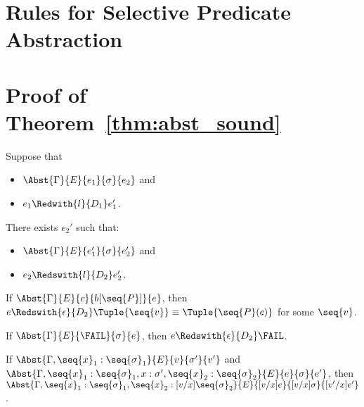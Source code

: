 \appendix

\section{Rules for Selective Predicate Abstraction}


\section{Proof of Theorem~\ref{thm:abst_sound}}



\begin{lemma}
\label{lem:sim}
Suppose that
\begin{itemize}
\item $\Abst{\Gamma}{E}{e_1}{\sigma}{e_2}$ and
\item $e_1 \Redwith{l}{D_1} e_1'$.
\end{itemize}
There exists $e_2'$ such that:
\begin{itemize}
\item $\Abst{\Gamma}{E}{e_1'}{\sigma}{e_2'}$ and
\item $e_2 \Redswith{l}{D_2} e_2'$.
\end{itemize}
\end{lemma}

\begin{lemma}
\label{lem:const}
If $\Abst{\Gamma}{E}{c}{b[\seq{P}]}{e}$, then
$e \Redswith{\epsilon}{D_2} \Tuple{\seq{v}} \equiv \Tuple{\seq{P}(c)}$ for some $\seq{v}$.
\end{lemma}

\begin{lemma}
\label{lem:fail}
If $\Abst{\Gamma}{E}{\FAIL}{\sigma}{e}$, then $e
\Redswith{\epsilon}{D_2} \FAIL$.
\end{lemma}

\begin{lemma}
\label{lem:sub}
If $\Abst{\Gamma,\seq{x}_1:\seq{\sigma}_1}{E}{v}{\sigma'}{v'}$ and
$\Abst{\Gamma,\seq{x}_1:\seq{\sigma}_1,x:\sigma',\seq{x}_2:\seq{\sigma}_2}{E}{e}{\sigma}{e'}$, then
$\Abst{\Gamma,\seq{x}_1:\seq{\sigma}_1,\seq{x}_2:[v/x]\seq{\sigma}_2}{E}{[v/x]e}{[v/x]\sigma}{[v'/x]e'}$.
\end{lemma}

